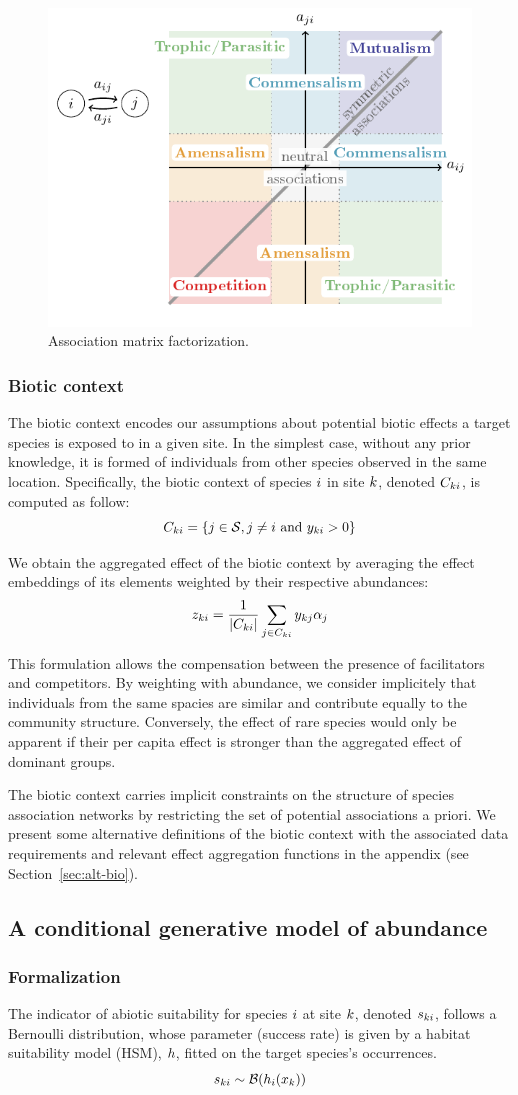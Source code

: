 \documentclass[10pt,a4paper]{article}
\newcommand{\inclPlt}[2]{\includegraphics[page=#1]{tikz_figures.pdf}}
\begin{document}
\begin{figure}[bthp]
  \centering
  \inclPlt{2}{schema_prod}
  \caption{Association matrix factorization.}
  \label{factoriz}
\end{figure}

\subsubsection{Biotic context}
The biotic context encodes our assumptions about potential biotic effects a target species is exposed to in a given site. In the simplest case, without any prior knowledge, it is formed of individuals from other species observed in the same location. Specifically, the biotic context of species $i$ in site $k$, denoted $C_{ki}$, is computed as follow:
\begin{equation*}
C_{ki} = \{j \in \mathcal{S}, j \neq i ~\text{and}~ y_{ki} > 0 \}
\end{equation*}

We obtain the aggregated effect of the biotic context by averaging the effect embeddings of its elements weighted by their respective abundances:   
\begin{equation*}
z_{ki} = \frac{1}{\left\lvert C_{ki}\right\rvert} \sum_{j \in C_{ki}} y_{kj} \alpha_{j}
\end{equation*}

This formulation allows the compensation between the presence of facilitators and competitors. By weighting with abundance, we consider implicitely that individuals from the same spacies are similar and contribute equally to the community structure. Conversely, the effect of rare species would only be apparent if their per capita effect is stronger than the aggregated effect of dominant groups.

The biotic context carries implicit constraints on the structure of species association networks by restricting the set of potential associations a priori. We present some alternative definitions of the biotic context with the associated data requirements and relevant effect aggregation functions in the appendix (see Section~\ref{sec:alt-bio}). 

\subsection{A conditional generative model of abundance}

\subsubsection{Formalization}
The indicator of abiotic suitability for species $i$ at site $k$, denoted $s_{ki}$, follows a Bernoulli distribution, whose parameter (success rate) is given by a habitat suitability model (HSM), $h$, fitted on the target species's occurrences.
\begin{equation*}
    s_{ki} \sim \mathcal{B}(h_{i}(x_{k}))
\end{equation*}
\end{document}
